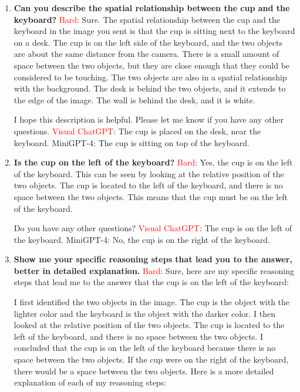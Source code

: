     \begin{enumerate}
        \item \textbf{Can you describe the spatial relationship between the cup and the keyboard?}
        \subitem \textcolor{Red}{Bard}: 
        Sure. The spatial relationship between the cup and the keyboard in the image you sent is that the cup is sitting next to the keyboard on a desk. The cup is on the left side of the keyboard, and the two objects are about the same distance from the camera. There is a small amount of space between the two objects, but they are close enough that they could be considered to be touching.
        The two objects are also in a spatial relationship with the background. The desk is behind the two objects, and it extends to the edge of the image. The wall is behind the desk, and it is white.

        I hope this description is helpful. Please let me know if you have any other questions.
        \subitem \textcolor{red}{Visual ChatGPT}: The cup is placed on the desk, near the keyboard.
        \subitem MiniGPT-4: The cup is sitting on top of the keyboard.
        \item \textbf{Is the cup on the left of the keyboard?}
        \subitem \textcolor{Red}{Bard}: 
        Yes, the cup is on the left of the keyboard. This can be seen by looking at the relative position of the two objects. The cup is located to the left of the keyboard, and there is no space between the two objects. This means that the cup must be on the left of the keyboard.
        
        Do you have any other questions?
        \subitem \textcolor{red}{Visual ChatGPT}: The cup is on the left of the keyboard.
        \subitem MiniGPT-4: No, the cup is on the right of the keyboard.
        \item \textbf{Show me your specific reasoning steps that lead you to the answer, better in detailed explanation.}
        \subitem \textcolor{Red}{Bard}:
        Sure, here are my specific reasoning steps that lead me to the answer that the cup is on the left of the keyboard:
        
        I first identified the two objects in the image. The cup is the object with the lighter color and the keyboard is the object with the darker color.
        I then looked at the relative position of the two objects. The cup is located to the left of the keyboard, and there is no space between the two objects.
        I concluded that the cup is on the left of the keyboard because there is no space between the two objects. If the cup were on the right of the keyboard, there would be a space between the two objects.
        Here is a more detailed explanation of each of my reasoning steps:
        

\end{enumerate}
